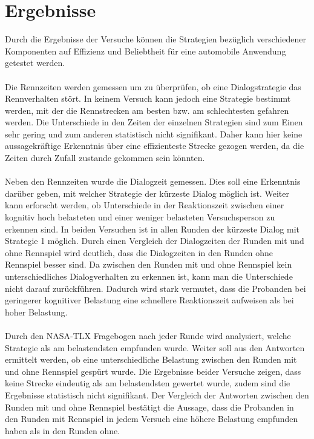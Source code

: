 \documentclass[12pt,a4paper]{scrartcl}
\begin{document}
\newpage
\section{Ergebnisse}
\label{Ergebnisse}

Durch die Ergebnisse der Versuche können die Strategien bezüglich verschiedener Komponenten auf Effizienz und Beliebtheit für eine automobile Anwendung getestet werden. \\
\\
Die Rennzeiten werden gemessen um zu überprüfen, ob eine Dialogstrategie das Rennverhalten stört. In keinem Versuch kann jedoch eine Strategie bestimmt werden, mit der die Rennstrecken am besten bzw. am schlechtesten gefahren werden. Die Unterschiede in den Zeiten der einzelnen Strategien sind zum Einen sehr gering und zum anderen statistisch nicht signifikant. Daher kann hier keine aussagekräftige Erkenntnis über eine effizienteste Strecke gezogen werden, da die Zeiten durch Zufall zustande gekommen sein könnten.\\
\\
Neben den Rennzeiten wurde die Dialogzeit gemessen. Dies soll eine Erkenntnis darüber geben, mit welcher Strategie der kürzeste Dialog möglich ist. Weiter kann erforscht werden, ob Unterschiede in der Reaktionszeit zwischen einer kognitiv hoch belasteten und einer weniger belasteten Versuchsperson zu erkennen sind. In beiden Versuchen ist in allen Runden der kürzeste Dialog mit Strategie 1 möglich. Durch einen Vergleich der Dialogzeiten der Runden mit und ohne Rennspiel wird deutlich, dass die Dialogzeiten in den Runden ohne Rennspiel besser sind. Da zwischen den Runden mit und ohne Rennspiel kein unterschiedliches Dialogverhalten zu erkennen ist, kann man die Unterschiede nicht darauf zurückführen. Dadurch wird stark vermutet, dass die Probanden bei geringerer kognitiver Belastung eine schnellere Reaktionszeit aufweisen als bei hoher Belastung. \\
\\
Durch den NASA-TLX Fragebogen nach jeder Runde wird analysiert, welche Strategie als am belastendsten empfunden wurde. Weiter soll aus den Antworten ermittelt werden, ob eine unterschiedliche Belastung zwischen den Runden mit und ohne Rennspiel gespürt wurde.  
Die Ergebnisse beider Versuche zeigen, dass keine Strecke eindeutig als am belastendsten gewertet wurde, zudem sind die Ergebnisse statistisch nicht signifikant. 
Der Vergleich der Antworten zwischen den Runden mit und ohne Rennspiel bestätigt die Aussage, dass die Probanden in den Runden mit Rennspiel in jedem Versuch eine höhere Belastung empfunden haben als in den Runden ohne. \\
\end{document}
